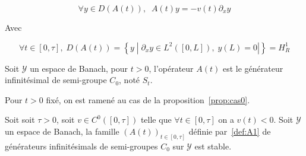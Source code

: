 \documentclass[a4paper]{article}
\begin{document}
\begin{equation}
	\label{def:A1}
	\forall y \in D(A(t)), \; \; A(t)y = -v(t)\partial_x y 
\end{equation}

Avec 

\[\forall t \in [0,\tau], \; D(A(t)) = 
\left\{y \; | \; \partial_x y \in L^2 ([0,L]),\; y(L) =0| \right\}
   = H_{R}^1\]

\begin{proposition}
	Soit $\mathscr{Y}$ un espace de Banach, pour $t>0$, 
	l'opérateur $A(t)$ est le générateur infinitésimal de semi-groupe $C_0$,
	noté $S_t$.
\end{proposition}

\begin{preuve}
	Pour $t>0$ fixé, on est ramené au cas de la proposition~\ref{prop:cas0}.
\end{preuve}

\begin{proposition}
	\label{prop:stable0}
	Soit soit $\tau>0$, soit $v \in C^0([0,\tau])$ telle que $\forall t \in [0,\tau]$ on a $v(t)<0$.
	Soit $\mathscr{Y}$ un espace de Banach, la famille $(A(t))_{t \in [0,\tau]}$ 
	définie par~\eqref{def:A1}
	de générateurs infinitésimals de semi-groupes $C_0$ sur $\mathscr{Y}$ est stable. 
\end{proposition}
\end{document}
